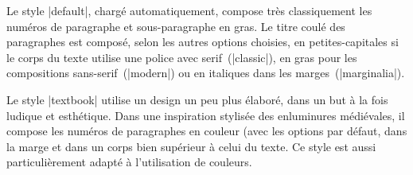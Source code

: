 \begin{macro}
\end{macro}


Le style |default|, chargé automatiquement, compose très classiquement les numéros de paragraphe et sous-paragraphe en gras. Le titre coulé des paragraphes est composé, selon les autres options choisies, en petites-capitales si le corps du texte utilise une police avec serif~(|classic|), en gras pour les compositions sans-serif~(|modern|) ou en italiques dans les marges~(|marginalia|).

\begin{noprint}
\end{noprint}

Le style |textbook| utilise un design un peu plus élaboré, dans un but à la fois ludique et esthétique. Dans une inspiration stylisée des enluminures médiévales, il compose les numéros de paragraphes en couleur (avec les options par défaut, dans la marge et dans un corps bien supérieur à celui du texte. Ce style est aussi particulièrement adapté à l'utilisation de couleurs.

